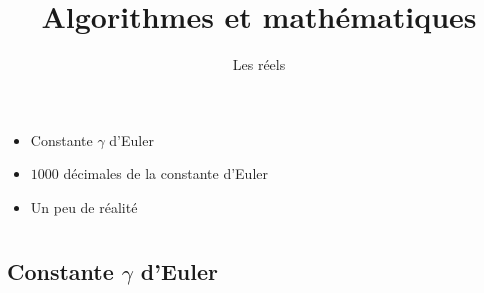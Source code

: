 



\newcommand{\Python}{\texttt{Python}}
\renewcommand{\evidence}[1]{{\color{blue}\textbf{#1}}}

\usepackage{textcomp}

\usepackage{listings}



\newcommand{\codeinline}[1]{\lstinline!#1!}







\title{{\bf Algorithmes et mathématiques}}
\subtitle{Les réels}

\begin{frame}
  
  \debutmontitre

  \pause

{\footnotesize
\hfill
{}
\begin{minipage}{0.6\textwidth}
  \begin{itemize}
    \item<3-> Constante $\gamma$ d'Euler
    \item<4-> $1000$ décimales de la constante d'Euler
    \item<5-> Un peu de réalité
  \end{itemize}
\end{minipage}
}

\end{frame}

\setcounter{framenumber}{0}


\section{}

\subsection{Constante $\gamma$ d'Euler}






